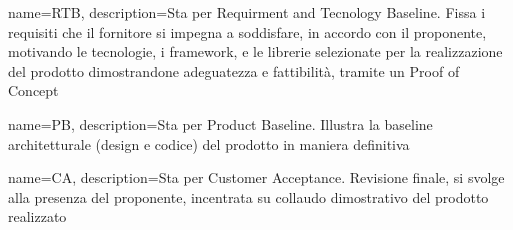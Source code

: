 {
	name={RTB},
	description={Sta per Requirment and Tecnology Baseline. Fissa i requisiti che il fornitore si impegna a soddisfare, in accordo con il proponente, motivando le tecnologie, i framework, e le librerie selezionate per la realizzazione del prodotto dimostrandone adeguatezza e fattibilità, tramite un Proof of Concept}
}

{
	name={PB},
	description={Sta per Product Baseline. Illustra la baseline architetturale (design e codice) del prodotto in maniera definitiva}
}

{
	name={CA},
	description={Sta per Customer Acceptance. Revisione finale, si svolge alla presenza del proponente, incentrata su collaudo dimostrativo del prodotto realizzato}
}

